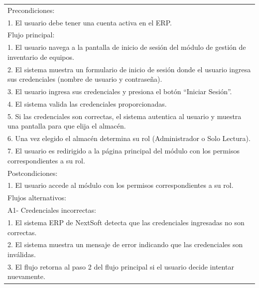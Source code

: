 \documentclass[stu, 12pt, letterpaper, donotrepeattitle, floatsintext, natbib]{apa7}
\begin{document}
\begin{longtable}{@{} p{16.5cm} @{}}
    Precondiciones:                                                                                                                           \\
    1. El usuario debe tener una cuenta activa en el ERP.                                                                                     \\ \midrule
    Flujo principal:                                                                                                                          \\
    1. El usuario navega a la pantalla de inicio de sesi\'on del m\'odulo de gesti\'on de inventario de equipos.                              \\
    2. El sistema muestra un formulario de inicio de sesi\'on donde el usuario ingresa sus credenciales (nombre de usuario y contrase\~{n}a). \\
    3. El usuario ingresa sus credenciales y presiona el bot\'on ``Iniciar Sesi\'on''.                                                        \\
    4. El sistema valida las credenciales proporcionadas.                                                                                     \\
    5. Si las credenciales son correctas, el sistema autentica al usuario y muestra una pantalla para que elija el almac\'en.                 \\
    6. Una vez elegido el almac\'en determina su rol (Administrador o Solo Lectura).                                                          \\
    7. El usuario es redirigido a la p\'agina principal del m\'odulo con los permisos correspondientes a su rol.                              \\ \midrule
    Postcondiciones:                                                                                                                          \\
    1. El usuario accede al m\'odulo con los permisos correspondientes a su rol.                                                              \\ \midrule
    Flujos alternativos:                                                                                                                      \\
    A1- Credenciales incorrectas:                                                                                                             \\
    \hspace{1cm}1. El sistema ERP de NextSoft detecta que las credenciales ingresadas no son correctas.                                       \\
    \hspace{1cm}2. El sistema muestra un mensaje de error indicando que las credenciales son inv\'alidas.                                     \\
    \hspace{1cm}3. El flujo retorna al paso 2 del flujo principal si el usuario decide intentar nuevamente.                                   \\ \bottomrule
\end{longtable}
\end{document}
